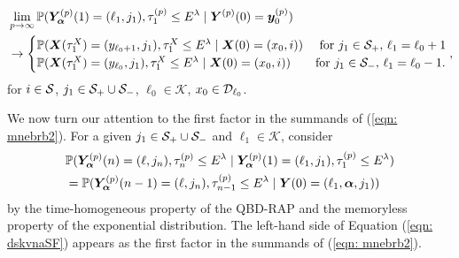 \begin{align}
	&\lim_{p\to\infty}\mathbb P(\bm{Y}_{\bm{\alpha}}^{(p)}(1)=(\ell_1, j_1), \tau_{1}^{(p)}\leq E^\lambda
	 \mid \boldsymbol Y^{(p)}(0)=\boldsymbol y_0^{(p)}) \nonumber
	 	\\&\to \begin{cases}
			\mathbb P(\boldsymbol X(\tau_1^X) = (y_{\ell_0+1}, j_1), \tau_{1}^X\leq E^\lambda 
            	 \mid \boldsymbol X(0) = (x_0, i)) 
	 &\text{ for }j_1\in\mathcal{S}_+,\, \ell_1=\ell_0+1\\ 
	 	\mathbb P(\boldsymbol X(\tau_1^X) = (y_{\ell_0}, j_1), \tau_{1}^X\leq E^\lambda 
            	 \mid \boldsymbol X(0) = (x_0, i)) & \text{for }j_1\in\mathcal{S}_-,\, \ell_1=\ell_0-1. 
\end{cases},\nonumber 
\end{align}
for \(i\in\mathcal{S}\), \(j_1\in\mathcal{S}_+\cup\mathcal{S}_-\), \(\ell_0\in\mathcal K\), \(x_0\in\mathcal{D}_{\ell_0}\).

We now turn our attention to the first factor in the summands of (\ref{eqn: mnebrb2}). For a given \(j_1\in\mathcal{S}_+\cup\mathcal{S}_-\) and \(\ell_1\in\mathcal K\),  consider
\begin{align}
	&\mathbb P(\bm{Y}_{\bm{\alpha}}^{(p)}(n) = (\ell, j_n), \tau_{n}^{(p)}\leq E^\lambda 
	 \mid \bm{Y}_{\bm{\alpha}}^{(p)}(1)=(\ell_1, j_1), \tau_1^{(p)}\leq E^\lambda) \nonumber 
	\\&=\mathbb P(\bm{Y}_{\bm{\alpha}}^{(p)}(n-1) = (\ell, j_n), \tau_{n-1}^{(p)}\leq E^\lambda 
	 \mid \boldsymbol Y(0)=(\ell_1,\boldsymbol \alpha, j_1))\label{eqn: dskvnaSF}
\end{align}
by the time-homogeneous property of the QBD-RAP and the memoryless property of the exponential distribution.
The left-hand side of Equation (\ref{eqn: dskvnaSF}) appears as the first factor in the summands of (\ref{eqn: mnebrb2}). 


